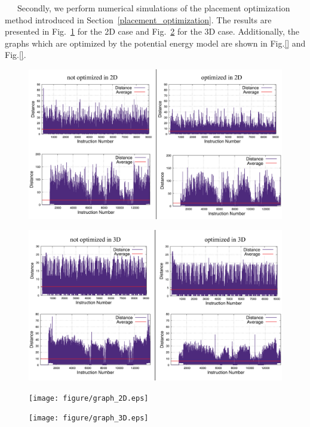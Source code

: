 \documentclass[a4paper,11pt]{ltjsarticle}
\begin{document}
{    \ \ \ Secondly, we perform numerical simulations of the placement optimization method introduced in Section~\ref{placement_optimization}. The results are presented in Fig.~\ref{placement_optimization_2D} for the 2D case and Fig.~\ref{placement_optimization_3D} for the 3D case. Additionally, the graphs which are optimized by the potential energy model are shown in Fig.\ref{} and Fig.\ref{}.
    \begin{figure}[h]
        \centering
        \includegraphics[scale=0.5]{figure/placement_optimization_2D.eps}
        \vspace{-20pt}\caption{}
        \label{placement_optimization_2D}
    \end{figure}
    
    \begin{figure}[h]
        \centering
        \includegraphics[scale=0.5]{figure/placement_optimization_3D.eps}
        \vspace{-20pt}\caption{}
        \label{placement_optimization_3D}
    \end{figure}
    \clearpage

    \begin{figure}[h]
        \centering
        \texttt{[image: figure/graph\_2D.eps]}
        \vspace{0pt}\caption{}
        \label{graph_2D}
        \texttt{[image: figure/graph\_3D.eps]}
        \vspace{0pt}\caption{}
        \label{graph_3D}
    \end{figure}
}
\end{document}
